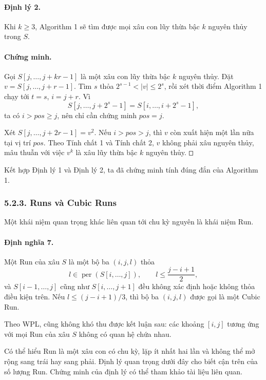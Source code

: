 \documentclass[11pt]{article}
\newcommand{\square}{\mathord{\vcenter{\hrule height .5pt
  \hbox{\vrule width .5pt height 5pt\kern5pt\vrule width .5pt}
  \hrule height .5pt}}}
\begin{document}
\paragraph{Định lý 2.}
Khi \(k\ge 3\), Algorithm 1 sẽ tìm được mọi xâu con lũy thừa bậc \(k\) nguyên
thủy trong \(S\).

\paragraph{Chứng minh.}
Gọi \(S[j,\ldots,j+k r-1]\) là một xâu con lũy thừa bậc \(k\) nguyên thủy. Đặt
\(v=S[j,\ldots,j+r-1]\). Tìm \(s\) thỏa \(2^{s-1}<|v|\le 2^s\), rồi xét thời
điểm Algorithm 1 chạy tới \(t=s\), \(i=j+r\). Vì
\[
  S[j,\ldots,j+2^s-1]=S[i,\ldots,i+2^s-1],
\]
ta có \(i>\mathit{pos}\ge j\), nên chỉ cần chứng minh \(\mathit{pos}=j\).

Xét \(S[j,\ldots,j+2r-1]=v^2\). Nếu \(i>\mathit{pos}>j\), thì \(v\) còn xuất
hiện một lần nữa tại vị trí \(\mathit{pos}\). Theo Tính chất 1 và Tính chất 2,
\(v\) không phải xâu nguyên thủy, mâu thuẫn với việc \(v^k\) là xâu lũy thừa
bậc \(k\) nguyên thủy. \(\square\)

Kết hợp Định lý 1 và Định lý 2, ta đã chứng minh tính đúng đắn của Algorithm
1.

\subsubsection*{5.2.3. Runs và Cubic Runs}

Một khái niệm quan trọng khác liên quan tới chu kỳ nguyên là khái niệm Run.

\paragraph{Định nghĩa 7.}
Một Run của xâu \(S\) là một bộ ba \((i,j,l)\) thỏa
\[
  l\in\operatorname{per}(S[i,\ldots,j]),\qquad l\le \frac{j-i+1}{2},
\]
và \(S[i-1,\ldots,j]\) cũng như \(S[i,\ldots,j+1]\) đều không xác định hoặc
không thỏa điều kiện trên. Nếu \(l\le (j-i+1)/3\), thì bộ ba \((i,j,l)\) được
gọi là một Cubic Run.

Theo WPL, cũng không khó thu được kết luận sau: các khoảng \([i,j]\) tương ứng
với mọi Run của xâu \(S\) không có quan hệ chứa nhau.

Có thể hiểu Run là một xâu con có chu kỳ, lặp ít nhất hai lần và không thể mở
rộng sang trái hay sang phải. Định lý quan trọng dưới đây cho biết cận trên
của số lượng Run. Chứng minh của định lý có thể tham khảo tài liệu liên quan.
\end{document}
